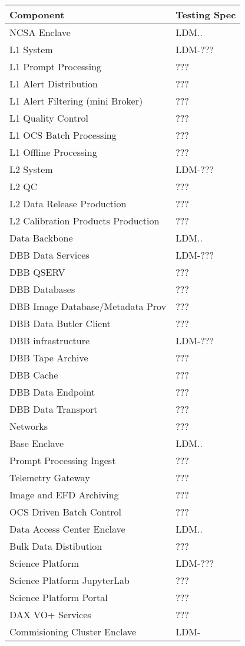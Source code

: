 \begin{longtable}{|p{}|p{}}\hline 
 \bf Component & Testing Spec \\ \hline   
NCSA Enclave &  LDM.. \\ \hline 
L1 System &  LDM-??? \\ \hline 
L1 Prompt Processing &  ??? \\ \hline 
L1 Alert Distribution &  ??? \\ \hline 
L1 Alert Filtering (mini Broker) &  ??? \\ \hline 
L1 Quality Control &  ??? \\ \hline 
L1 OCS Batch Processing &  ??? \\ \hline 
L1 Offline Processing &  ??? \\ \hline 
L2 System &  LDM-??? \\ \hline 
L2 QC &  ??? \\ \hline 
L2 Data Release Production &  ??? \\ \hline 
L2 Calibration Products Production  &  ??? \\ \hline 
Data Backbone &  LDM.. \\ \hline 
DBB Data Services &  LDM-??? \\ \hline 
DBB QSERV &  ??? \\ \hline 
DBB Databases &  ??? \\ \hline 
DBB Image Database/Metadata Prov &  ??? \\ \hline 
DBB Data Butler Client &  ??? \\ \hline 
DBB infrastructure &  LDM-??? \\ \hline 
DBB Tape Archive &  ??? \\ \hline 
DBB Cache &  ??? \\ \hline 
DBB Data Endpoint &  ??? \\ \hline 
DBB Data Transport &  ??? \\ \hline 
Networks  &  ??? \\ \hline 
Base Enclave &  LDM.. \\ \hline 
Prompt Processing Ingest  &  ??? \\ \hline 
Telemetry Gateway &  ??? \\ \hline 
Image and EFD Archiving &  ??? \\ \hline 
OCS Driven Batch Control &  ??? \\ \hline 
Data Access Center Enclave &  LDM.. \\ \hline 
 Bulk Data Distibution &  ??? \\ \hline 
Science Platform &  LDM-??? \\ \hline 
Science Platform JupyterLab &  ??? \\ \hline 
Science Platform Portal &  ??? \\ \hline 
DAX VO+ Services &  ??? \\ \hline 
Commisioning Cluster Enclave &  LDM- \\ \hline 
\end{longtable} 
